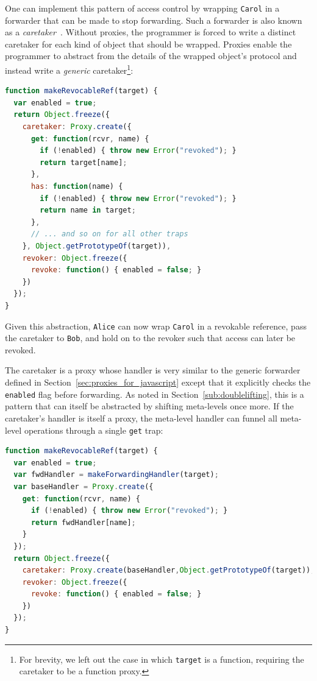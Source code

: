 \documentclass{sig-alternate}
\begin{document}
One can implement this pattern of access control by wrapping \texttt{Carol} in a forwarder that can be made to stop forwarding. Such a forwarder is also known as a \emph{caretaker}~\cite{redell74naming}. Without proxies, the programmer is forced to write a distinct caretaker for each kind of object that should be wrapped. Proxies enable the programmer to abstract from the details of the wrapped object's protocol and instead write a \emph{generic} caretaker\footnote{For brevity, we left out the case in which \texttt{target} is a function, requiring the caretaker to be a function proxy.}:

\begin{lstlisting}[language=javascript]
function makeRevocableRef(target) {
  var enabled = true;
  return Object.freeze({
    caretaker: Proxy.create({
      get: function(rcvr, name) {
        if (!enabled) { throw new Error("revoked"); }
        return target[name];
      },
      has: function(name) {
        if (!enabled) { throw new Error("revoked"); }
        return name in target;      
      },
      // ... and so on for all other traps
    }, Object.getPrototypeOf(target)),
    revoker: Object.freeze({
      revoke: function() { enabled = false; }
    })
  });
}
\end{lstlisting}

Given this abstraction, \texttt{Alice} can now wrap \texttt{Carol} in a revokable reference, pass the caretaker to \texttt{Bob}, and hold on to the revoker such that access can later be revoked.

The caretaker is a proxy whose handler is very similar to the generic forwarder defined in Section~\ref{sec:proxies_for_javascript} except that it explicitly checks the \texttt{enabled} flag before forwarding. As noted in Section~\ref{sub:doublelifting}, this is a pattern that can itself be abstracted by shifting meta-levels once more. If the caretaker's handler is itself a proxy, the meta-level handler can funnel all meta-level operations through a single \texttt{get} trap:

\begin{lstlisting}[language=javascript]
function makeRevocableRef(target) {
  var enabled = true;
  var fwdHandler = makeForwardingHandler(target);
  var baseHandler = Proxy.create({
    get: function(rcvr, name) {
      if (!enabled) { throw new Error("revoked"); }
      return fwdHandler[name];
    }
  });
  return Object.freeze({
    caretaker: Proxy.create(baseHandler,Object.getPrototypeOf(target)),
    revoker: Object.freeze({
      revoke: function() { enabled = false; }
    })
  });
}
\end{lstlisting}
\end{document}

